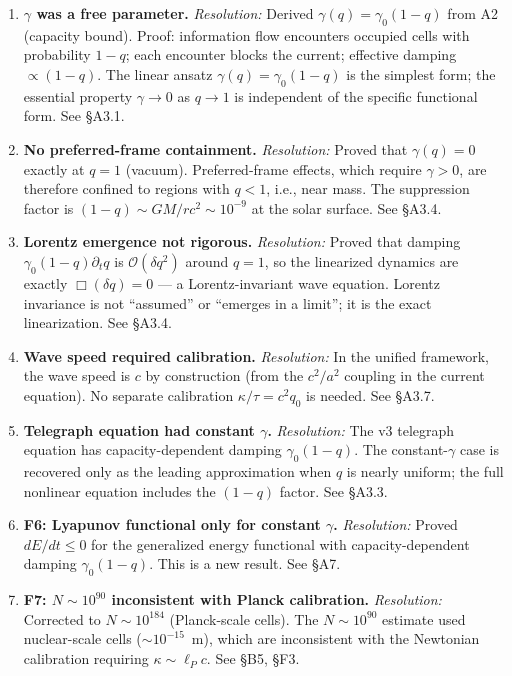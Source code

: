\documentclass[reprint]{revtex4-2}
\begin{document}
\begin{enumerate}[leftmargin=*]
\item[\textbf{F1:}] \textbf{$\gamma$ was a free parameter.} \textit{Resolution:} Derived $\gamma(q)=\gamma_0(1-q)$ from A2 (capacity bound). Proof: information flow encounters occupied cells with probability $1-q$; each encounter blocks the current; effective damping $\propto (1-q)$. The linear ansatz $\gamma(q)=\gamma_0(1-q)$ is the simplest form; the essential property $\gamma\to 0$ as $q\to 1$ is independent of the specific functional form. See \S A3.1.

\item[\textbf{F2:}] \textbf{No preferred-frame containment.} \textit{Resolution:} Proved that $\gamma(q)=0$ exactly at $q=1$ (vacuum). Preferred-frame effects, which require $\gamma>0$, are therefore confined to regions with $q<1$, i.e., near mass. The suppression factor is $(1-q) \sim GM/rc^2 \sim 10^{-9}$ at the solar surface. See \S A3.4.

\item[\textbf{F3:}] \textbf{Lorentz emergence not rigorous.} \textit{Resolution:} Proved that damping $\gamma_0(1-q)\partial_t q$ is $\mathcal{O}(\delta q^2)$ around $q=1$, so the linearized dynamics are exactly $\Box(\delta q)=0$ --- a Lorentz-invariant wave equation. Lorentz invariance is not ``assumed'' or ``emerges in a limit''; it is the exact linearization. See \S A3.4.

\item[\textbf{F4:}] \textbf{Wave speed required calibration.} \textit{Resolution:} In the unified framework, the wave speed is $c$ by construction (from the $c^2/a^2$ coupling in the current equation). No separate calibration $\kappa/\tau = c^2 q_0$ is needed. See \S A3.7.

\item[\textbf{F5:}] \textbf{Telegraph equation had constant $\gamma$.} \textit{Resolution:} The v3 telegraph equation has capacity-dependent damping $\gamma_0(1-q)$. The constant-$\gamma$ case is recovered only as the leading approximation when $q$ is nearly uniform; the full nonlinear equation includes the $(1-q)$ factor. See \S A3.3.

\item \textbf{F6: Lyapunov functional only for constant $\gamma$.} \textit{Resolution:} Proved $dE/dt \le 0$ for the generalized energy functional with capacity-dependent damping $\gamma_0(1-q)$. This is a new result. See \S A7.

\item \textbf{F7: $N\sim 10^{90}$ inconsistent with Planck calibration.} \textit{Resolution:} Corrected to $N\sim 10^{184}$ (Planck-scale cells). The $N\sim 10^{90}$ estimate used nuclear-scale cells ($\sim 10^{-15}$~m), which are inconsistent with the Newtonian calibration requiring $\kappa \sim \ell_P c$. See \S B5, \S F3.
\end{enumerate}
\end{document}
